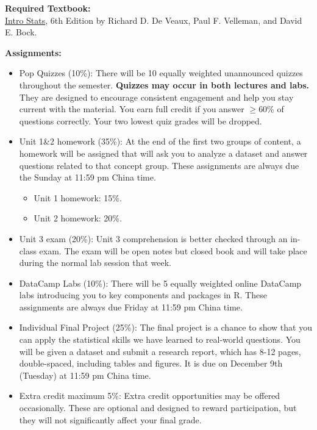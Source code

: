 \documentclass[11pt]{article}
\begin{document}
\vspace{0.5cm}
\large \textbf{Required Textbook:}\\[0.5em]
\href{https://www.pearson.com/en-us/subject-catalog/p/intro-stats/P200000006161/9780137374922?srsltid=AfmBOorburBAh8Z5hPZXmajuzatW53zDClHAQe8Ks9Fk1pQrkGpSkBuC}{Intro Stats}, 6th Edition by Richard D. De Veaux, Paul F. Velleman, and David E. Bock.





\vspace{0.5cm}
\large \textbf{Assignments:}
\begin{itemize}
    \item Pop Quizzes (10\%): There will be 10 equally weighted unannounced quizzes throughout the semester. \textbf{Quizzes may occur in both lectures and labs.} They are designed to encourage consistent engagement and help you stay current with the material. You earn full credit if you answer $\geq$60\% of questions correctly. Your two lowest quiz grades will be dropped.
    \item Unit 1\&2 homework (35\%): At the end of the first two groups of content, a homework will be assigned that
    will ask you to analyze a dataset and answer questions related to that concept group. These assignments are always due the Sunday at 11:59 pm China time. 
    \begin{itemize}
        \item Unit 1 homework: 15\%.
        \item Unit 2 homework: 20\%.
    \end{itemize}
    \item Unit 3 exam (20\%): Unit 3 comprehension is better checked through an in-class exam. The exam will be open notes but closed book and will take place during the normal lab session that week.
    \item DataCamp Labs (10\%): There will be 5 equally weighted online DataCamp labs introducing you to key components and packages in R. These assignments are always due Friday at 11:59 pm China time. 
    \item Individual Final Project (25\%): The final project is a chance to show that you can apply the statistical skills we have learned to real-world questions. You will be given a dataset and submit a research report, which has 8-12 pages, double-spaced, including tables and figures. It is due on December 9th (Tuesday) at 11:59 pm China time. 
    \item Extra credit maximum 5\%: Extra credit opportunities may be offered occasionally. These are optional and designed to reward participation, but they will not significantly affect your final grade.
\end{itemize}
\end{document}
